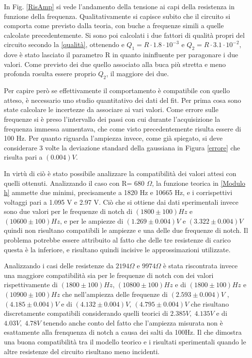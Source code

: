 \documentclass[leqno]{article}
\begin{document}
	In Fig. \ref{RisAmp} si vede l'andamento della tensione ai capi della resistenza in funzione della frequenza. Qualitativamente si capisce subito che il circuito si comporta come previsto dalla teoria, con buche a frequenze simili a quelle calcolate precedentemente. Si sono poi calcolati i due fattori di qualità propri del circuito secondo la \ref{qualità}, ottenendo  e $Q_1 = R\cdot 1.8 \cdot 10^{-3}$ e $Q_2 = R\cdot 3.1 \cdot 10^{-2}$, dove è stato lasciato il parametro R in quanto ininfluente per paragonare i due valori.
	Come previsto dei due quello associato alla buca più stretta e meno profonda rosulta essere proprio $Q_2$, il maggiore dei due.
	
	Per capire però se effettivamente il comportamento è compatibile con quello atteso, è necessario uno studio quantitativo dei dati del fit.
	Per prima cosa sono state calcolare le incertezze da associare ai vari valori.
	Come errore sulle frequenze si è preso l'intervallo dei passi con cui durante l'acquisizione la frequenza immessa aumentava, che come visto precedentemente risulta essere di 100 Hz.
	Per quanto riguarda l'ampiezza invece, come già spiegato, si deve considerare 3 volte la deviazione standard della gaussiana in Figura \ref{errore} che risulta pari a $(0.004)V$.
	
	In virtù di ciò è stato possibile analizzare la compatibilità dei valori attesi con quelli ottenuti.
	Analizzando il caso con R= 680 $\Omega$, la funzione teorica in \eqref{Modulo h} ammette due minimi, precisamente a 1820 Hz e 10665 Hz, e i corrispettivi voltaggi pari a 1.095 V e 2.97 V. Ciò che si ottiene dai dati sperimentali invece sono due valori per le frequenze di notch di $(1800 \pm 100)Hz$ e $(10600 \pm 100)Hz$, e per le ampiezze di $( 1.269 \pm 0.004)V $ e $ (3.322 \pm 0.004)V$ quindi non risultano compatibili le ampiezze e una delle due frequenze di notch.
	Il problema potrebbe essere attribuito al fatto che delle tre resistenze di carico questa è la inferiore, e risultano quindi incisive le approssimazioni utilizzate.
	
	
	
	Analizzando i casi delle resistenze da $2194\Omega$ e $9974\Omega$ è stata riscontrata invece una maggiore compatibilità sia per le frequenze di notch con dei valori rispettivamente di $(1800 \pm 100)Hz$, $(10800 \pm 100)Hz$ e di $(1800 \pm 100)Hz$ e $(10900 \pm 100)Hz$ che nell'ampiezza delle frequenze di $( 2.593 \pm 0.004)V $ , $( 4.185 \pm 0.004)V $ e di $ (4.132 \pm 0.004)V $, $ (4.795 \pm 0.004)V $ che risultano discretamente compatibili considerando quelli teorici di $2.385V, \;   4.135V$ e di $ 4.03V , \;  4.78V$ tenendo anche conto del fatto che l'ampiezza misurata non è esattamente alla frenquenza di notch a causa dei salti da 100Hz. Il che dimostra una buona compatibilità tra il modello teorico e i risultati sperimentali quando le altre resistenze del circuito risultano meno incidenti.
	
\end{document}

